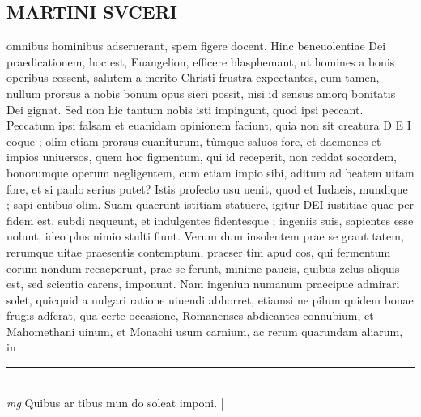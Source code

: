 \documentclass{article}
\begin{document}
\begin{pages}
\section*{MARTINI SVCERI }\pstart omnibus hominibus adseruerant, spem figere docent.  Hinc beneuolentiae Dei praedicationem, hoc est, Euangelion, efficere blasphemant, ut homines a bonis operibus cessent, salutem a merito Christi frustra expectantes, cum tamen, nullum prorsus a nobis bonum opus sieri possit, nisi id sensus amorq bonitatis Dei gignat.  Sed non hic tantum nobis isti impingunt, quod ipsi peccant.  Peccatum ipsi falsam et euanidam opinionem faciunt, quia non sit creatura D E I coque ; olim etiam prorsus euaniturum, tùmque saluos fore, et daemones et impios uniuersos, quem hoc figmentum, qui id receperit, non reddat socordem, bonorumque operum negligentem, cum etiam impio sibi, aditum ad beatem uitam fore, et si paulo serius putet?  \pend\pstart Istis profecto usu uenit, quod et Iudaeis, mundique ; sapi entibus olim. Suam quaerunt istitiam statuere, igitur DEI iustitiae quae per fidem est, subdi nequeunt, et indulgentes fidentesque ; ingeniis suis, sapientes esse uolunt, ideo plus nimio stulti fiunt.  Verum dum insolentem prae se graut tatem, rerumque uitae praesentis contemptum, praeser tim apud cos, qui fermentum eorum nondum recaeperunt, prae se ferunt, minime paucis, quibus zelus aliquis est, sed scientia carens, imponunt.  Nam ingeniun numanum praecipue admirari solet, quicquid a uulgari ratione uiuendi abhorret, etiamsi ne pilum quidem bonae frugis adferat, qua certe occasione, Romanenses abdicantes connubium, et Mahomethani uinum, et Monachi usum carnium, ac rerum quarundam aliarum, in  \pend
\vspace{0.5cm}\noindent
\vspace{0.2cm}\rule{1cm}{0.2pt}\\ 
\hspace{0.2cm}\textit{mg}
\footnotesize Quibus   ar tibus mun do soleat imponi.  
\normalsize| 

\end{pages}
\end{document}
